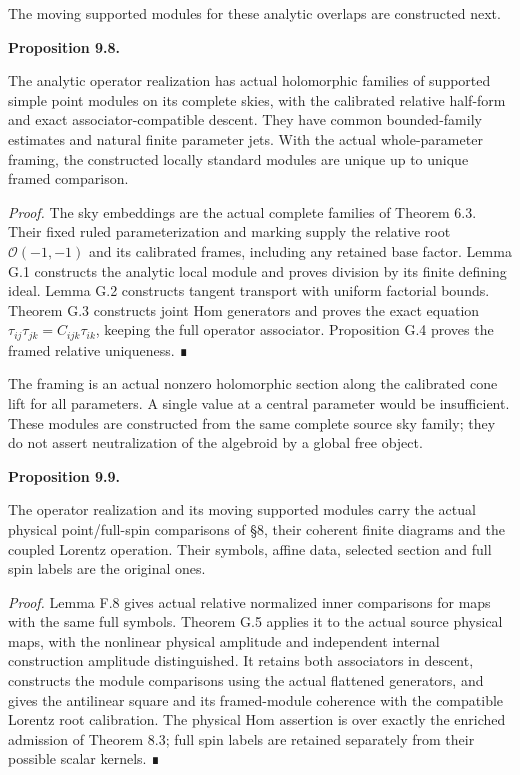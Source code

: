 \documentclass[
  english,
  11pt,
  reqno]{amsart}
\makeatletter
\newcommand{\pandocstatementheading}[1]{%
  \par\addpenalty{\@beginparpenalty}%
  \addvspace{.5\baselineskip plus .2\baselineskip minus .2\baselineskip}%
  {\normalfont\bfseries #1\par}%
  \nobreak\@afterindenttrue\@afterheading
}
\makeatother
\begin{document}
The moving supported modules for these analytic overlaps are constructed
next.

\pandocstatementheading{\protect{}\label{prop:gg-relative-sky-operator-modules}Proposition 9.8.}

The analytic operator realization has actual holomorphic families of
supported simple point modules on its complete skies, with the
calibrated relative half-form and exact associator-compatible descent.
They have common bounded-family estimates and natural finite parameter
jets. With the actual whole-parameter framing, the constructed locally
standard modules are unique up to unique framed comparison.

\emph{Proof.} The sky embeddings are the actual complete families of
Theorem 6.3. Their fixed ruled parameterization and marking supply the
relative root \(\mathcal O(-1,-1)\) and its calibrated frames, including
any retained base factor. Lemma G.1 constructs the analytic local module
and proves division by its finite defining ideal. Lemma G.2 constructs
tangent transport with uniform factorial bounds. Theorem G.3 constructs
joint Hom generators and proves the exact equation
\(\tau_{ij}\tau_{jk}=C_{ijk}\tau_{ik}\), keeping the full operator
associator. Proposition G.4 proves the framed relative uniqueness. ∎

The framing is an actual nonzero holomorphic section along the
calibrated cone lift for all parameters. A single value at a central
parameter would be insufficient. These modules are constructed from the
same complete source sky family; they do not assert neutralization of
the algebroid by a global free object.

\pandocstatementheading{\protect{}\label{prop:gg-op-physical-source-comparisons}Proposition 9.9.}

The operator realization and its moving supported modules carry the
actual physical point/full-spin comparisons of §8, their coherent finite
diagrams and the coupled Lorentz operation. Their symbols, affine data,
selected section and full spin labels are the original ones.

\emph{Proof.} Lemma F.8 gives actual relative normalized inner
comparisons for maps with the same full symbols. Theorem G.5 applies it
to the actual source physical maps, with the nonlinear physical
amplitude and independent internal construction amplitude distinguished.
It retains both associators in descent, constructs the module
comparisons using the actual flattened generators, and gives the
antilinear square and its framed-module coherence with the compatible
Lorentz root calibration. The physical Hom assertion is over exactly the
enriched admission of Theorem 8.3; full spin labels are retained
separately from their possible scalar kernels. ∎
\end{document}
